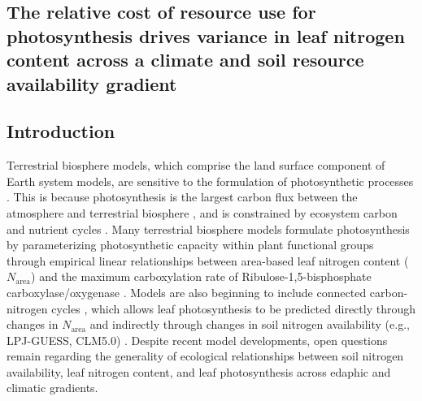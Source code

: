 \begin{singlespace}
    \chapter{\textbf{The relative cost of resource use for photosynthesis drives variance in leaf nitrogen content across a climate and soil resource availability gradient}}
\end{singlespace}

\section{Introduction}
Terrestrial biosphere models, which comprise the land surface component of Earth system models, are sensitive to the formulation of photosynthetic processes . This is because photosynthesis is the largest carbon flux between the atmosphere and terrestrial biosphere , and is constrained by ecosystem carbon and nutrient cycles . Many terrestrial biosphere models formulate photosynthesis by parameterizing photosynthetic capacity within plant functional groups through empirical linear relationships between area-based leaf nitrogen content ($N_\mathrm{area}$) and the maximum carboxylation rate of Ribulose-1,5-bisphosphate carboxylase/oxygenase . Models are also beginning to include connected carbon-nitrogen cycles , which allows leaf photosynthesis to be predicted directly through changes in $N_\mathrm{area}$ and indirectly through changes in soil nitrogen availability (e.g., LPJ-GUESS, CLM5.0) . Despite recent model developments, open questions remain regarding the generality of ecological relationships between soil nitrogen availability, leaf nitrogen content, and leaf photosynthesis across edaphic and climatic gradients.

